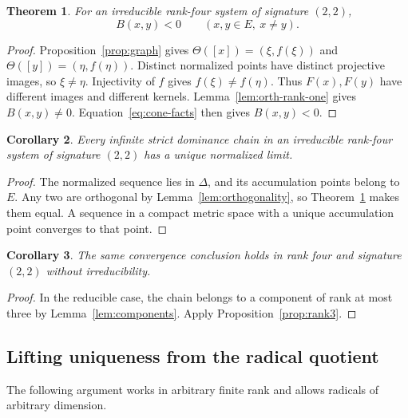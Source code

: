 \documentclass[11pt,reqno]{amsart}
\theoremstyle{plain}
\newtheorem{theorem}{Theorem}[section]
\newtheorem{corollary}[theorem]{Corollary}
\theoremstyle{definition}
\theoremstyle{remark}
\numberwithin{equation}{section}
\begin{document}
\begin{theorem}\label{thm:strict-negative}
For an irreducible rank-four system of signature $(2,2)$,
\[
B(x,y)<0\qquad(x,y\in E,\ x\neq y).
\]
\end{theorem}
\begin{proof}
Proposition~\ref{prop:graph} gives $\Theta([x])=(\xi,f(\xi))$ and $\Theta([y])=(\eta,f(\eta))$. Distinct normalized points have distinct projective images, so $\xi\neq\eta$. Injectivity of $f$ gives $f(\xi)\neq f(\eta)$. Thus $F(x),F(y)$ have different images and different kernels. Lemma~\ref{lem:orth-rank-one} gives $B(x,y)\neq0$. Equation~\eqref{eq:cone-facts} then gives $B(x,y)<0$.
\end{proof}

\begin{corollary}\label{cor:22-chain}
Every infinite strict dominance chain in an irreducible rank-four system of signature $(2,2)$ has a unique normalized limit.
\end{corollary}
\begin{proof}
The normalized sequence lies in $\Delta$, and its accumulation points belong to $E$. Any two are orthogonal by Lemma~\ref{lem:orthogonality}, so Theorem~\ref{thm:strict-negative} makes them equal. A sequence in a compact metric space with a unique accumulation point converges to that point.
\end{proof}

\begin{corollary}\label{cor:22-reducible}
The same convergence conclusion holds in rank four and signature $(2,2)$ without irreducibility.
\end{corollary}
\begin{proof}
In the reducible case, the chain belongs to a component of rank at most three by Lemma~\ref{lem:components}. Apply Proposition~\ref{prop:rank3}.
\end{proof}

\subsection{Lifting uniqueness from the radical quotient}

The following argument works in arbitrary finite rank and allows radicals of arbitrary dimension.
\end{document}
